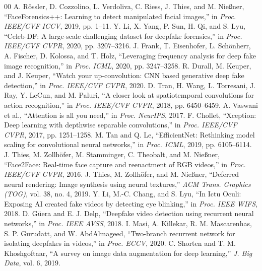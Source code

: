 \documentclass[conference,10pt]{IEEEtran}
\begin{document}

\begin{thebibliography}{00}
 A. R\"ossler, D. Cozzolino, L. Verdoliva, C. Riess, J. Thies, and M. Nie{\ss}ner, ``FaceForensics++: Learning to detect manipulated facial images,'' in \textit{Proc. IEEE/CVF ICCV}, 2019, pp. 1--11.
 Y. Li, X. Yang, P. Sun, H. Qi, and S. Lyu, ``Celeb-DF: A large-scale challenging dataset for deepfake forensics,'' in \textit{Proc. IEEE/CVF CVPR}, 2020, pp. 3207--3216.
 J. Frank, T. Eisenhofer, L. Sch\"onherr, A. Fischer, D. Kolossa, and T. Holz, ``Leveraging frequency analysis for deep fake image recognition,'' in \textit{Proc. ICML}, 2020, pp. 3247--3258.
 R. Durall, M. Keuper, and J. Keuper, ``Watch your up-convolution: CNN based generative deep fake detection,'' in \textit{Proc. IEEE/CVF CVPR}, 2020.
 D. Tran, H. Wang, L. Torresani, J. Ray, Y. LeCun, and M. Paluri, ``A closer look at spatiotemporal convolutions for action recognition,'' in \textit{Proc. IEEE/CVF CVPR}, 2018, pp. 6450--6459.
 A. Vaswani et al., ``Attention is all you need,'' in \textit{Proc. NeurIPS}, 2017.
 F. Chollet, ``Xception: Deep learning with depthwise separable convolutions,'' in \textit{Proc. IEEE/CVF CVPR}, 2017, pp. 1251--1258.
 M. Tan and Q. Le, ``EfficientNet: Rethinking model scaling for convolutional neural networks,'' in \textit{Proc. ICML}, 2019, pp. 6105--6114.
 J. Thies, M. Zollh\"ofer, M. Stamminger, C. Theobalt, and M. Nie{\ss}ner, ``Face2Face: Real-time face capture and reenactment of RGB videos,'' in \textit{Proc. IEEE/CVF CVPR}, 2016.
 J. Thies, M. Zollh\"ofer, and M. Nie{\ss}ner, ``Deferred neural rendering: Image synthesis using neural textures,'' \textit{ACM Trans. Graphics (TOG)}, vol. 38, no. 4, 2019.
 Y. Li, M.-C. Chang, and S. Lyu, ``In Ictu Oculi: Exposing AI created fake videos by detecting eye blinking,'' in \textit{Proc. IEEE WIFS}, 2018.
 D. G\"uera and E. J. Delp, ``Deepfake video detection using recurrent neural networks,'' in \textit{Proc. IEEE AVSS}, 2018.
 I. Masi, A. Killekar, R. M. Mascarenhas, S. P. Gurudatt, and W. AbdAlmageed, ``Two-branch recurrent network for isolating deepfakes in videos,'' in \textit{Proc. ECCV}, 2020.
 C. Shorten and T. M. Khoshgoftaar, ``A survey on image data augmentation for deep learning,'' \textit{J. Big Data}, vol. 6, 2019.
\end{thebibliography}
\end{document}
